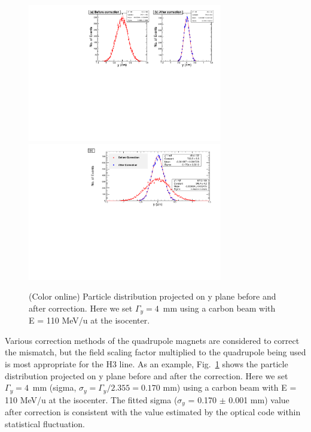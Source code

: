 \documentclass[jkps,preprint,fleqn,showpacs,showkeys,10pt,twocolumn]{revtex4}
\begin{document}
\begin{figure}[h]
  \begin{center}
    \includegraphics[width=8.5cm]{Fig08-1.pdf}
    \includegraphics[width=8.5cm]{Fig08-2.pdf}        
    \caption{(Color online) Particle distribution projected on y plane before and after correction.
      Here we set $\Gamma_{y} = 4$~mm using a carbon beam with E = 110 MeV/u at the isocenter.}
    \label{fig7}
  \end{center}
\end{figure}
Various correction methods of the quadrupole magnets are considered to correct the mismatch,
but the field scaling factor multiplied to the quadrupole being used is most appropriate for the H3 line.
As an example, Fig.~\ref{fig7} shows the particle distribution projected on y plane before and after the correction.
Here we set $\Gamma_{y} = 4$~mm (sigma, $\sigma_{y} = \Gamma_{y}/2.355 = 0.170$ mm) using a carbon beam with E = 110 MeV/u at the isocenter.
The fitted sigma ($\sigma_{y}$ = 0.170 $\pm$ 0.001 mm) value after correction is consistent with the value estimated by the optical code within statistical fluctuation.
\end{document}
